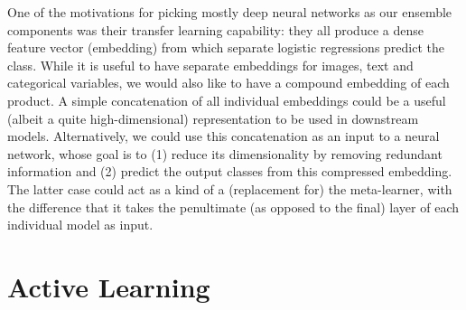 One of the motivations for picking mostly deep neural networks as our ensemble components was their transfer learning capability: they all produce a dense feature vector (embedding) from which separate logistic regressions predict the class.
While it is useful to have separate embeddings for images, text and categorical variables, we would also like to have a compound embedding of each product.
A simple concatenation of all individual embeddings could be a useful (albeit a quite high-dimensional) representation to be used in downstream models.
Alternatively, we could use this concatenation as an input to a neural network, whose goal is to (1) reduce its dimensionality by removing redundant information and (2) predict the output classes from this compressed embedding.
The latter case could act as a kind of a (replacement for) the meta-learner, with the difference that it takes the penultimate (as opposed to the final) layer of each individual model as input.


\section{Active Learning}
\label{bg_al}
